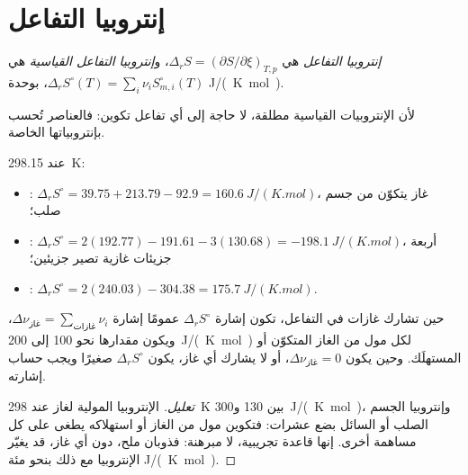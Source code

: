 \section{إنتروبيا التفاعل}

\begin{definition}\label{def:b2:reaction-free-energy:reaction-entropy}
\emph{إنتروبيا التفاعل} هي $\Delta_r S =
(\partial S/\partial\xi)_{T,p}$، و\emph{إنتروبيا التفاعل
القياسية} هي $\Delta_r S^\circ(T) =
\sum_i\nu_iS^\circ_{m,i}(T)$، بوحدة \unit{J/(K.mol)}.
\end{definition}

لأن الإنتروبيات القياسية مطلقة، لا حاجة إلى أي تفاعل تكوين: فالعناصر تُحسب
بإنتروبياتها الخاصة.

\begin{example}\label{ex:b2:reaction-free-energy:entropies}
عند \qty{298.15}{K}:
\begin{itemize}
  \item {}: $\Delta_r S^\circ = 39.75 + 213.79 -
        92.9 = \qty{+160.6}{J/(K.mol)}$، غاز يتكوّن من جسم صلب؛
  \item {}: $\Delta_r S^\circ = 2(192.77) -
        191.61 - 3(130.68) = \qty{-198.1}{J/(K.mol)}$، أربعة جزيئات غازية
        تصير جزيئين؛
  \item {}: $\Delta_r S^\circ = 2(240.03) - 304.38 =
        \qty{+175.7}{J/(K.mol)}$.
\end{itemize}
\end{example}

\begin{proposition}\label{prop:b2:reaction-free-energy:sign-rule}
حين تشارك غازات في التفاعل، تكون إشارة $\Delta_r S^\circ$ عمومًا إشارة
$\Delta\nu_{\text{غاز}} = \sum_{\text{غازات}}\nu_i$، ويكون مقدارها نحو
\qty{100}{} إلى \qty{200}{J/(K.mol)} لكل مول من الغاز المتكوّن أو المستهلَك. وحين
يكون $\Delta\nu_{\text{غاز}} = 0$، أو لا يشارك أي غاز، يكون $\Delta_r S^\circ$
صغيرًا ويجب حساب إشارته.
\end{proposition}

\begin{proof}[تعليل]
الإنتروبيا المولية لغاز عند \qty{298}{K} بين 130 
و\qty{300}{J/(K.mol)}، وإنتروبيا الجسم الصلب أو السائل بضع عشرات: فتكوين مول
من الغاز أو استهلاكه يطغى على كل مساهمة أخرى. إنها قاعدة تجريبية، لا
مبرهنة: فذوبان ملح، دون أي غاز، قد يغيّر الإنتروبيا مع ذلك بنحو مئة
\unit{J/(K.mol)}.
\end{proof}

